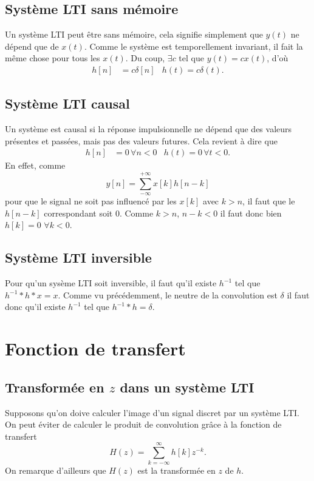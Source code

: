 
\subsection{Système LTI sans mémoire}
Un système LTI peut être sans mémoire,
cela signifie simplement que $y(t)$ ne dépend que de $x(t)$.
Comme le système est temporellement invariant,
il fait la même chose pour tous les $x(t)$.
Du coup, $\exists c$ tel que $y(t) = cx(t)$, d'où
\begin{align*}
  h[n] & = c \delta[n] & h(t) = c \delta(t).
\end{align*}

\subsection{Système LTI causal}
Un système est causal si la réponse impulsionnelle ne dépend
que des valeurs présentes et passées, mais pas des valeurs futures.
Cela revient à dire que
\begin{align*}
  h[n] & = 0 \, \forall n < 0  & h(t) = 0 \, \forall t < 0.
\end{align*}
En effet, comme
\[ y[n] = \sum_{-\infty}^{+\infty}x[k]h[n-k] \]
pour que le signal ne soit pas influencé par les $x[k]$ avec
$k > n$, il faut que le $h[n-k]$ correspondant soit 0.
Comme $k > n$, $n - k < 0$ il faut donc bien $h[k] = 0$ $\forall k < 0$.

\subsection{Système LTI inversible}
Pour qu'un sysème LTI soit inversible, il faut qu'il existe $h^{-1}$ tel que
$h^{-1}*h*x = x$.
Comme vu précédemment, le neutre de la convolution est $\delta$ il faut donc
qu'il existe $h^{-1}$ tel que $h^{-1} * h = \delta$.


\section{Fonction de transfert}
\subsection{Transformée en $z$ dans un système LTI}
Supposons qu'on doive calculer l'image d'un signal discret par un système LTI.
On peut éviter de calculer le produit de convolution grâce à la fonction
de transfert
\[ H(z) = \sum_{k=-\infty}^{\infty} h[k] z^{-k}. \]
On remarque d'ailleurs que $H(z)$ est la transformée en $z$ de $h$.

